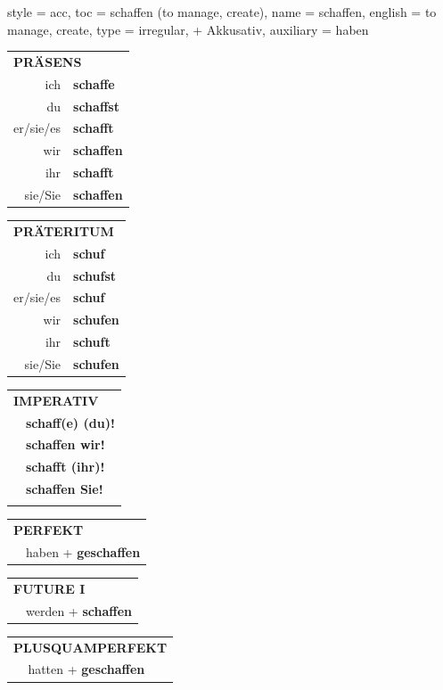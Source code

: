 \begin{verbentry}{
  style = {acc},
  toc = {schaffen (to manage, create)},
  name = {schaffen},
  english = {to manage, create},
  type = {irregular, + Akkusativ},
  auxiliary = {haben}
}
  \begin{tabular}{rl}
     \multicolumn{2}{l}{\textbf{PRÄSENS} }\\
    ich & \textbf{schaffe}\\
    du & \textbf{schaffst}\\
    er/sie/es & \textbf{schafft}\\
    wir & \textbf{schaffen}\\
    ihr & \textbf{schafft}\\
    sie/Sie & \textbf{schaffen}\\
  \end{tabular}
  \hfill
     \begin{tabular}{rl}
    \multicolumn{2}{l}{\textbf{PRÄTERITUM} }\\
    ich & \textbf{schuf}\\
    du & \textbf{schufst}\\
    er/sie/es & \textbf{schuf}\\
    wir & \textbf{schufen}\\
    ihr & \textbf{schuft}\\
    sie/Sie & \textbf{schufen}\\
  \end{tabular}
  \hfill
  \begin{tabular}{rl}
     \multicolumn{2}{l}{\textbf{IMPERATIV} }\\
   & \textbf{schaff(e) (du)!}\\
   & \textbf{schaffen wir!}\\
   & \textbf{schafft (ihr)!}\\
   & \textbf{schaffen Sie!}\\
   & \vspace{10pt}
  \end{tabular}

    \vspace{10pt}

 \begin{tabular}{rl}
     \multicolumn{2}{l}{\textbf{PERFEKT}}\\
   & haben + \textbf{geschaffen}\\
  \end{tabular}
\hfill
   \begin{tabular}{rl}
   
    \multicolumn{2}{l}{\textbf{FUTURE I} }\\
  &  werden + \textbf{schaffen}\\
 
  \end{tabular}
\hfill
   \begin{tabular}{rl}
      \multicolumn{2}{l}{\textbf{PLUSQUAMPERFEKT}}\\
  &  hatten + \textbf{geschaffen}\\
  \end{tabular}
  

\end{verbentry}
